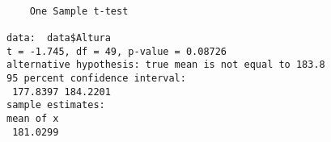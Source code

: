 \documentclass[11pt]{article}
\begin{document}
    
    \begin{verbatim}

	One Sample t-test

data:  data$Altura
t = -1.745, df = 49, p-value = 0.08726
alternative hypothesis: true mean is not equal to 183.8
95 percent confidence interval:
 177.8397 184.2201
sample estimates:
mean of x 
 181.0299 

    \end{verbatim}

    
    \begin{center}
    \end{center}
    { \hspace*{\fill} \\}
    

    
    
    
    
\end{document}
